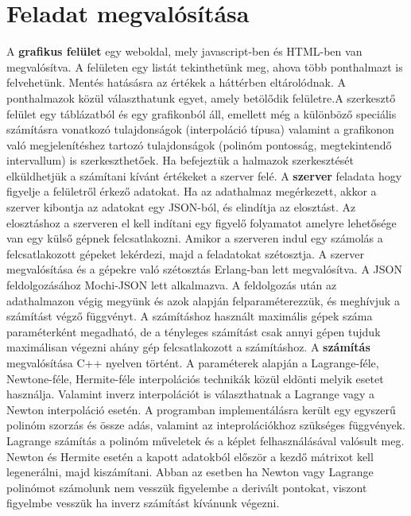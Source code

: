 \documentclass{elteikthesis}
\begin{document}
\section{Feladat megvalósítása}
A \textbf{grafikus felület}  egy weboldal, mely javascript-ben és HTML-ben van megvalósítva.
 A felületen egy listát tekinthetünk meg, ahova több ponthalmazt is felvehetünk. \newline  Mentés hatásásra az értékek a háttérben eltárolódnak. A ponthalmazok közül választhatunk egyet, amely betölődik felületre.\newline A szerkesztő felület egy táblázatból és egy grafikonból áll, emellett még a különböző speciális számításra vonatkozó tulajdonságok (interpoláció típusa) valamint a grafikonon való megjelenítéshez tartozó tulajdonságok (polinóm pontosság, megtekintendő intervallum) is szerkeszthetőek. \newline Ha befejeztük a halmazok szerkesztését elküldhetjük a számítani kívánt értékeket a szerver felé.
\newline\newline
A \textbf{szerver} feladata hogy figyelje a felületről érkező adatokat. Ha az adathalmaz megérkezett, akkor a szerver kibontja az adatokat egy JSON-ból, és elindítja az elosztást. \newline
Az elosztáshoz a szerveren el kell indítani egy figyelő folyamatot amelyre lehetősége van egy külső gépnek felcsatlakozni. Amikor a szerveren indul egy számolás a felcsatlakozott gépeket lekérdezi, majd a feladatokat szétosztja.\newline
A szerver megvalósítása és a gépekre való szétosztás Erlang-ban lett megvalósítva. A JSON feldolgozásához Mochi-JSON lett alkalmazva. A feldolgozás után az adathalmazon végig megyünk és azok alapján felparaméterezzük, és meghívjuk a számítást végző függvényt.\newline
A számításhoz használt maximális gépek száma paraméterként megadható, de a tényleges számítást csak annyi gépen tujduk maximálisan végezni ahány gép felcsatlakozott a számításhoz.
\newline\newline
A \textbf{számítás} megvalósítása C++ nyelven történt. A paraméterek alapján a Lagrange-féle, Newtone-féle, Hermite-féle interpolációs technikák közül eldönti melyik esetet használja.\newline 
Valamint inverz interpolációt is választhatnak a Lagrange vagy a Newton interpoláció esetén. \newline
A programban implementálásra került egy egyszerű polinóm szorzás és össze adás, valamint az inteprolációkhoz szükséges függvények. Lagrange számítás a polinóm műveletek és a képlet felhasználásával valósult meg. Newton és Hermite esetén a kapott adatokból először a kezdő mátrixot kell legenerálni, majd kiszámítani. \newline
Abban az esetben ha Newton vagy Lagrange polinómot számolunk nem vesszük figyelembe a derivált pontokat, viszont figyelmbe vesszük ha inverz számítást kívánunk végezni. 
\end{document}
